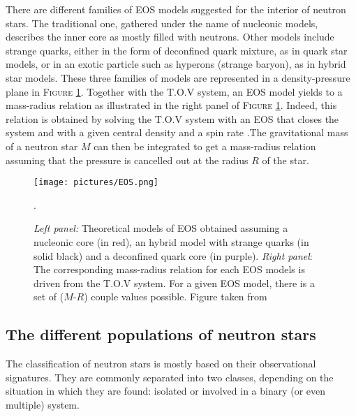 \documentclass[a4paper, twoside, 12pt]{article}
\numberwithin{equation}{section}
\begin{document}
\hspace{\parindent}	  There are different families of  EOS models suggested for the interior of neutron stars. The traditional one, gathered under the name of nucleonic models,  describes the inner core as mostly filled with neutrons. %
Other models include strange quarks, either in the form of deconfined quark mixture, as in quark star models, or in an exotic particle such as hyperons (strange baryon), as in hybrid star models. 
These three families of models are represented in a density-pressure plane in F\textsc{igure} \ref{fig:EOS}. Together with the T.O.V system, an EOS model yields to a mass-radius relation as illustrated in the right panel of  F\textsc{igure} \ref{fig:EOS}.
Indeed, this relation is obtained by solving the T.O.V system with an EOS that closes the system and with a given central density and a spin rate \cite{Hartle&Thorne}.The gravitational mass of a neutron star $M$ can then be integrated to get a mass-radius relation assuming that the pressure is cancelled out at the radius  $R$ of the star. 


\begin{figure}[!h]
\centering
\texttt{[image: pictures/EOS.png]}
\caption[EOS models and mass-radius relationship]{{\itshape{Left panel}: }Theoretical models of EOS obtained assuming a nucleonic core (in red), an hybrid model with strange quarks (in solid black) and a deconfined quark core (in purple).  {\itshape{Right panel}}: The corresponding mass-radius relation for each EOS models is driven from the T.O.V system. For a given EOS model, there is a set of ($M$-$R$) couple values possible. Figure taken from \cite{Watts+2015}}.
\label{fig:EOS}
\end{figure}


\subsection{The different populations of neutron stars }
\label{subsec: PulsarsPop}
\hspace{\parindent}	 The classification of neutron stars is mostly based on their observational signatures. They are commonly separated into two classes, depending on the situation in which they are found: isolated or involved in a binary (or even multiple) system. 
\\
\end{document}
